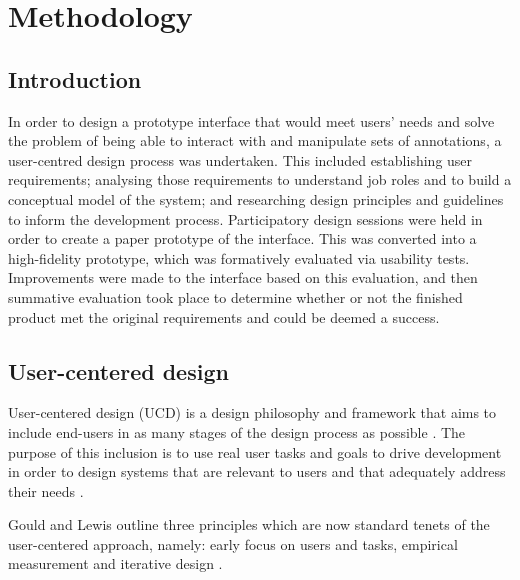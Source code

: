 
\chapter{Methodology} %

\label{Methodology} %


\section{Introduction}
In order to design a prototype interface that would meet users' needs and solve the problem of being able to interact with and manipulate sets of annotations, a user-centred design process was undertaken. This included establishing user requirements; analysing those requirements to understand job roles and to build a conceptual model of the system; and researching design principles and guidelines to inform the development process. Participatory design sessions were held in order to create a paper prototype of the interface. This was converted into a high-fidelity prototype, which was formatively evaluated via usability tests. Improvements were made to the interface based on this evaluation, and then summative evaluation took place to determine whether or not the finished product met the original requirements and could be deemed a success. 

\section{User-centered design}
User-centered design (UCD) is a design philosophy and framework that aims to include end-users in as many stages of the design process as possible \citep{Abras}. The purpose of this inclusion is to use real user tasks and goals to drive development in order to design systems that are relevant to users and that adequately address their needs \citep[p. 327]{RogersPreece}.

Gould and Lewis \citep{GouldLewis} outline three principles which are now standard tenets of the user-centered approach, namely: early focus on users and tasks, empirical measurement and iterative design \citep[p. 327]{RogersPreece}.

